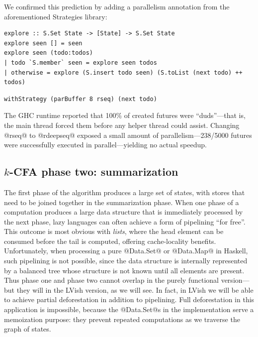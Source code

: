 We confirmed this prediction by adding a parallelism annotation from
the aforementioned Strategies library:



\singlespacing
\begin{lstlisting}[float, caption={The \il{explore} function from a purely functional $k$-CFA implementation.}, label=listing-pure-k-cfa]
explore :: S.Set State -> [State] -> S.Set State
explore seen [] = seen
explore seen (todo:todos)
| todo `S.member` seen = explore seen todos
| otherwise = explore (S.insert todo seen) (S.toList (next todo) ++ todos)
\end{lstlisting}
\doublespacing

\singlespacing
\begin{lstlisting}
withStrategy (parBuffer 8 rseq) (next todo)
\end{lstlisting}
\doublespacing

\noindent The GHC runtime reported that 100\% of created futures were
``duds''---that is, the main thread forced them before any helper
thread could assist.  Changing @rseq@ to @rdeepseq@ exposed a small
amount of parallelism---238/5000 futures were successfully executed in
parallel---yielding no actual speedup.

\subsection{$k$-CFA phase two: summarization}

The first phase of the algorithm produces a large set of states, with
stores that need to be joined together in the summarization phase.
When one phase of a computation produces a large data structure that
is immediately processed by the next phase, lazy languages can often
achieve a form of pipelining ``for free''.  This outcome is most
obvious with \emph{lists}, where the head element can be consumed
before the tail is computed, offering cache-locality benefits.
Unfortunately, when processing a pure @Data.Set@ or @Data.Map@ in
Haskell, such pipelining is not possible, since the data structure is
internally represented by a balanced tree whose structure is not known
until all elements are present.  Thus phase one and phase two cannot
overlap in the purely functional version---but they will in the LVish
version, as we will see.  In fact, in LVish we will be able to achieve
partial deforestation in addition to pipelining.  Full deforestation
in this application is impossible, because the @Data.Set@s in the
implementation serve a memoization purpose: they prevent repeated
computations as we traverse the graph of states.

